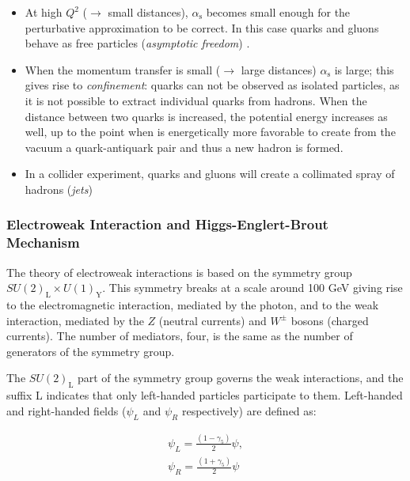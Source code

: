 \begin{itemize}
\item At high $Q^2$ ($\rightarrow$ small distances), $\alpha_\mathrm{s}$ becomes small enough for the perturbative approximation to be correct. In this case quarks and gluons behave as free particles (\textit{asymptotic freedom}) \cite{PhysRevLett.30.1343}\cite{PhysRevLett.30.1346}.
\item When the momentum transfer is small ($\rightarrow$ large distances) $\alpha_\mathrm{s}$ is large; this gives rise to \textit{confinement}: quarks can not be observed as isolated particles, as it is not possible to extract individual quarks from hadrons. When the distance between two quarks is increased, the potential energy increases as well, up to the point when is energetically more favorable to create from the vacuum a quark-antiquark pair and thus a new hadron is formed.
\item In a collider experiment, quarks and gluons will create a collimated spray of hadrons (\textit{jets})
\end{itemize}



\subsubsection{Electroweak Interaction and Higgs-Englert-Brout Mechanism}
\label{sec:smsusy:ew}

The theory of electroweak interactions is based on the symmetry group $SU(2)_\mathrm{L} \times U(1)_\mathrm{Y}$. This symmetry breaks at a scale around 100 GeV giving rise to the electromagnetic interaction, mediated by the photon, and to the weak interaction, mediated by the $Z$ (neutral currents) and $W^{\pm}$ bosons (charged currents). The number of mediators, four, is the same as the number of generators of the symmetry group. 

The $SU(2)_\mathrm{L}$ part of the symmetry group governs the weak interactions, and the suffix L indicates that only left-handed particles participate to them. Left-handed and right-handed fields ($\psi_L$ and $\psi_R$ respectively) are defined as:

\begin{equation}
\begin{aligned}
\psi_L = \frac{(1 - \gamma_5)}{2} \psi, \\
\psi_R = \frac{(1 + \gamma_5)}{2} \psi
\end{aligned}
\label{eq:sm:LR}
\end{equation}

